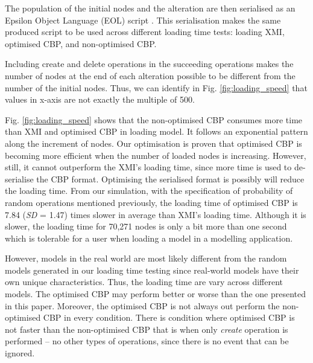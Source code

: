 \documentclass[sigconf]{acmart}
\begin{document}
The population of the initial nodes and the alteration are then serialised as an Epsilon Object Language (EOL) script \cite{kolovos2006epsilon}. This serialisation makes the same produced script to be used across different loading time tests: loading XMI, optimised CBP, and non-optimised CBP. 

Including create and delete operations in the succeeding operations makes the number of nodes at the end of each alteration possible to be different from the number of the initial nodes. Thus, we can identify in Fig. \ref{fig:loading_speed} that values in x-axis are not exactly the multiple of 500.    

Fig. \ref{fig:loading_speed} shows that the non-optimised CBP consumes more time than XMI and optimised CBP in loading model. It follows an exponential pattern along the increment of nodes. Our optimisation is proven that optimised CBP is becoming more efficient when the number of loaded nodes is increasing. However, still, it cannot outperform the XMI's loading time, since more time is used to de-serialise the CBP format. Optimising the serialised format is possibly will reduce the loading time. From our simulation, with the specification of probability of random operations mentioned previously, the loading time of optimised CBP is 7.84 (\textit{SD} = 1.47) times slower in average than XMI's loading time. Although it is slower, the loading time for 70,271 nodes is only a bit more than one second which is tolerable for a user when loading a model in a modelling application. 

However, models in the real world are most likely different from the random models generated in our loading time testing since real-world models have their own unique characteristics. Thus, the loading time are vary across different models. The optimised CBP may perform better or worse than the one presented in this paper. Moreover, the optimised CBP is not always out perform the non-optimised CBP in every condition. There is condition where optimised CBP is not faster than the non-optimised CBP that is when only \emph{create} operation is performed -- no other types of operations, since there is no event that can be ignored. 
\end{document}
